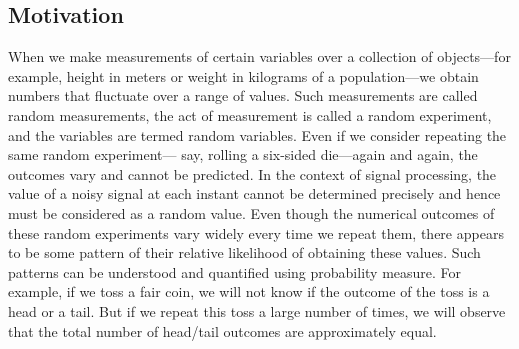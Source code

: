 \documentclass{article}
\begin{document}
\subsection{Motivation}
When we make measurements of certain variables over a collection of
objects—for example, height in meters or weight in kilograms of a
population—we obtain numbers that fluctuate over a range of values.
Such measurements are called random measurements, the act of measurement is called a random experiment, and the variables are termed random
variables. Even if we consider repeating the same random experiment—
say, rolling a six-sided die—again and again, the outcomes vary and
cannot be predicted. In the context of signal processing, the value of a
noisy signal at each instant cannot be determined precisely and hence
must be considered as a random value.
Even though the numerical outcomes of these random experiments
vary widely every time we repeat them, there appears to be some pattern
of their relative likelihood of obtaining these values. Such patterns can be
understood and quantified using probability measure. For example, if we
toss a fair coin, we will not know if the outcome of the toss is a head or
a tail. But if we repeat this toss a large number of times, we will observe
that the total number of head/tail outcomes are approximately equal.
\end{document}
